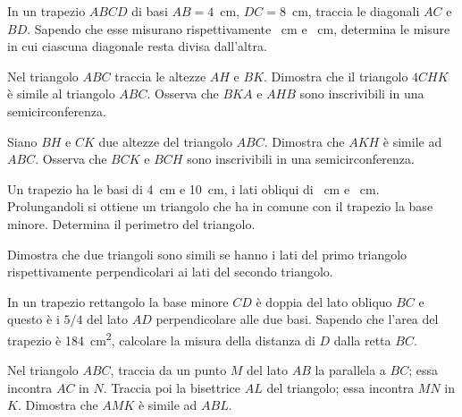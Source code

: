 \begin{multicols}{2}
\begin{esercizio}
\label{ese:6.64}
In un trapezio $ABCD$ di basi $AB=4$~cm, $DC=8$~cm, traccia le diagonali $AC$ e $BD$. Sapendo che esse misurano rispettivamente ~cm e ~cm, determina le misure in cui ciascuna diagonale resta divisa dall'altra.
\end{esercizio}

\begin{esercizio}
\label{ese:6.65}
Nel triangolo $ABC$ traccia le altezze $AH$ e $BK$. Dimostra che il triangolo $4CHK$ è simile al triangolo $ABC$. Osserva che $BKA$ e $AHB$ sono inscrivibili in una semicirconferenza.
\end{esercizio}

\begin{esercizio}
\label{ese:6.66}
Siano $BH$ e $CK$ due altezze del triangolo $ABC$. Dimostra che $AKH$ è simile ad $ABC$. Osserva che $BCK$ e $BCH$ sono inscrivibili in una semicirconferenza.
\end{esercizio}

\begin{esercizio}
\label{ese:6.67}
Un trapezio ha le basi di 4~cm e 10~cm, i lati obliqui di ~cm e ~cm. Prolungandoli si ottiene un triangolo che ha in comune con il trapezio la base minore. Determina il perimetro del triangolo.
\end{esercizio}

\begin{esercizio}
\label{ese:6.68}
Dimostra che due triangoli sono simili se hanno i lati del primo triangolo rispettivamente perpendicolari ai lati del secondo triangolo. 
\end{esercizio}

\begin{esercizio}
\label{ese:6.69}
In un trapezio rettangolo la base minore $CD$ è doppia del lato obliquo $BC$ e questo è i $5/4$ del lato $AD$ perpendicolare alle due basi. Sapendo che l'area del trapezio è 184~cm\textsuperscript{2}, calcolare la misura della distanza di $D$ dalla retta $BC$. 
\end{esercizio}

\begin{esercizio}
\label{ese:6.70}
Nel triangolo $ABC$, traccia da un punto $M$ del lato $AB$ la parallela a $BC$; essa incontra $AC$ in $N$. Traccia poi la bisettrice $AL$ del triangolo; essa incontra $MN$ in $K$. Dimostra che $AMK$ è simile ad $ABL$.
\end{esercizio}


\end{multicols}
